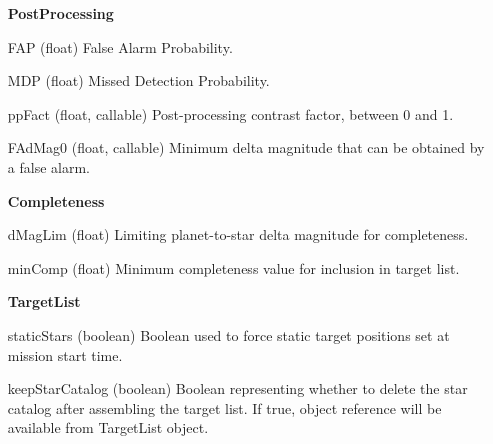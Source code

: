 \documentclass[cleanfoot]{asme2ej}
\begin{document}
\begin{itemize}[leftmargin=1.5in,font={\ttfamily}]
\item[\textbf{PostProcessing}]
\item[FAP] (float) False Alarm Probability.
\item[MDP] (float) Missed Detection Probability.
\item[ppFact] (float, callable) Post-processing contrast factor, between 0 and 1.
\item[FAdMag0] (float, callable) Minimum delta magnitude that can be obtained by a false alarm.

\item[\textbf{Completeness}]
\item[dMagLim] (float) Limiting planet-to-star delta magnitude for completeness.
\item[minComp] (float) Minimum completeness value for inclusion in target list.

\item[\textbf{TargetList}]
\item[staticStars] (boolean) Boolean used to force static target positions set at mission start time.
\item[keepStarCatalog] (boolean) Boolean representing whether to delete the star catalog after assembling the target list.  If true, object reference will be available from TargetList object.


\end{itemize}
\end{document}
